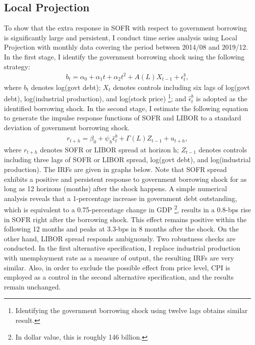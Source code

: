 \documentclass[12pt]{article}
\begin{document}
\subsection{Local Projection}
To show that the extra response in SOFR with respect to government borrowing is significantly large and persistent,
I conduct time series analysis using Local Projection with monthly data covering the period
between 2014/08 and 2019/12. In the first stage, I identify the government borrowing shock
using the following strategy:
\begin{align*}
  b_t=\alpha_0+\alpha_1t+\alpha_2t^2+A(L)X_{t-1}+\epsilon_t^b,
\end{align*}
where $b_t$ denotes log(govt debt); $X_t$ denotes controls including six lags of log(govt debt), log(industrial production), and log(stock price)
\footnote{Identifying the government borrowing shock using twelve lags obtains similar result.}; and
$\hat{\epsilon}_t^b$ is adopted as the identified borrowing shock. In the second stage, I estimate the following equation to generate the impulse response functions of SOFR and LIBOR to a standard deviation of government
borrowing shock.
\begin{align*}
  r_{t+h}=\beta_0+\psi_h \hat{\epsilon}_t^b +\Gamma(L)Z_{t-1}+u_{t+h},
\end{align*}
where $r_{t+h}$ denotes SOFR or LIBOR spread at horizon h; $Z_{t-1}$ denotes controls including three lags of SOFR or LIBOR spread, log(govt debt), and log(industrial production).
The IRFs are given in graphs below. Note that SOFR spread exhibits a positive and persistent response to government
borrowing shock for as long as 12 horizons (months) after the shock happens. A simple numerical analysis reveals that a 1-percentage increase in government debt outstanding, which is equivalent to a
0.75-percentage change in GDP \footnote{In dollar value, this is roughly 146 billion.}, results in a 0.8-bps rise in SOFR right after the borrowing shock. 
This effect remains positive within the following 12 months and peaks at 3.3-bps in 8 months after the shock.
On the other hand, LIBOR spread responds ambiguously. Two robustness checks are conducted. In the first alternative specification, I replace industrial production with unemployment rate as a measure of output,
the resulting IRFs are very similar. Also, in order to exclude the possible effect from price level, CPI is employed as a control in the second alternative specification, and the results remain unchanged.
\end{document}
